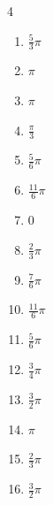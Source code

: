 \begin{multicols}{4}
\begin{enumerate}
  \item $\displaystyle \frac{5}{3}\pi$

  \item $\displaystyle \pi$

  \item $\displaystyle \pi$

  \item $\displaystyle \frac{\pi}{3}$

  \item $\displaystyle \frac{5}{6}\pi$

  \item $\displaystyle \frac{11}{6}\pi$

  \item $\displaystyle 0$

  \item $\displaystyle \frac{2}{3}\pi$

  \item $\displaystyle \frac{7}{6}\pi$

  \item $\displaystyle \frac{11}{6}\pi$

  \item $\displaystyle \frac{5}{6}\pi$

  \item $\displaystyle \frac{3}{4}\pi$

  \item $\displaystyle \frac{3}{2}\pi$

  \item $\displaystyle \pi$

\columnbreak %

  \item $\displaystyle \frac{2}{3}\pi$

  \item $\displaystyle \frac{3}{2}\pi$


\end{enumerate}
\end{multicols}
